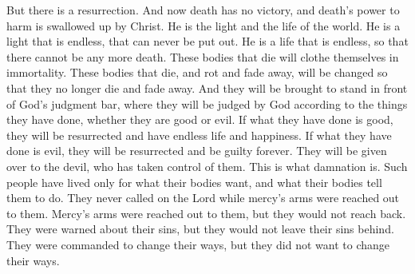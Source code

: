 \bverse \iffalse But there is a resurrection, therefore the grave hath no victory, and the sting of death is swallowed up in Christ. \fi
But there is a resurrection. And now death has no victory, and death's power to harm is swallowed up by Christ.
\bverse \iffalse He is the light and the life of the world; yea, a light that is endless, that can never be darkened; yea, and also a life which is endless, that there can be no more death. \fi
He is the light and the life of the world. He is a light that is endless, that can never be put out. He is a life that is endless, so that there cannot be any more death.
\bverse \iffalse Even this mortal shall put on immortality, and this corruption shall put on incorruption, and shall be brought to stand before the bar of God, to be judged of him according to their works whether they be good or whether they be evil-- \fi
These bodies that die will clothe themselves in immortality. These bodies that die, and rot and fade away, will be changed so that they no longer die and fade away. And they will be brought to stand in front of God's judgment bar, where they will be judged by God according to the things they have done, whether they are good or evil.
\bverse \iffalse If they be good, to the resurrection of endless life and happiness; and if they be evil, to the resurrection of endless damnation, being delivered up to the devil, who hath subjected them, which is damnation-- \fi
If what they have done is good, they will be resurrected and have endless life and happiness. If what they have done is evil, they will be resurrected and be guilty forever. They will be given over to the devil, who has taken control of them. This is what damnation is.
\bverse \iffalse Having gone according to their own carnal wills and desires; having never called upon the Lord while the arms of mercy were extended towards them; for the arms of mercy were extended towards them, and they would not; they being warned of their iniquities and yet they would not depart from them; and they were commanded to repent and yet they would not repent. \fi
Such people have lived only for what their bodies want, and what their bodies tell them to do. They never called on the Lord while mercy's arms were reached out to them. Mercy's arms were reached out to them, but they would not reach back. They were warned about their sins, but they would not leave their sins behind. They were commanded to change their ways, but they did not want to change their ways.
\bverse \iffalse And now, ought ye not to tremble and repent of your sins, and remember that only in and through Christ ye can be saved? \fi
